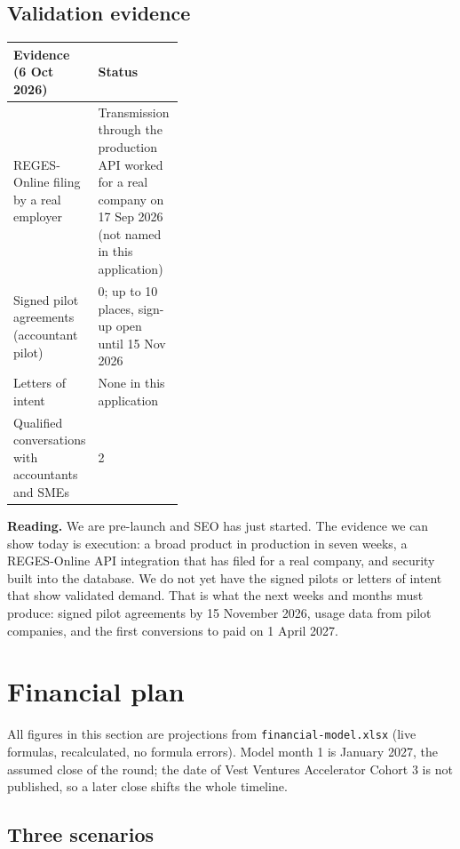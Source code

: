 \documentclass[10pt,a4paper]{article}
\newcommand{\fisier}[1]{\nolinkurl{#1}}
\begin{document}
\subsection{Validation evidence}

\begin{table}[H]
\centering\small
\begin{tabularx}{\linewidth}{@{}P{0.38\linewidth}L@{}}
\toprule
\textbf{Evidence (6 Oct 2026)} & \textbf{Status} \\
\midrule
REGES-Online filing by a real employer & Transmission through the production API worked for a real
company on 17 Sep 2026 (not named in this application) \\
Signed pilot agreements (accountant pilot) & 0; up to 10 places, sign-up open until 15 Nov 2026 \\
Letters of intent & None in this application \\
Qualified conversations with accountants and SMEs & 2 \\
\bottomrule
\end{tabularx}
\end{table}

\textbf{Reading.} We are pre-launch and SEO has just started. The evidence we can show today is
execution: a broad product in production in seven weeks, a REGES-Online API integration that has
filed for a real company, and security built into the database. We do not yet have the signed
pilots or letters of intent that show validated demand. That is what the next weeks and months
must produce: signed pilot agreements by 15 November 2026, usage data from pilot companies, and
the first conversions to paid on 1 April 2027.

\section{Financial plan}\label{sec:financiar}\nobreak

All figures in this section are projections from \fisier{financial-model.xlsx} (live formulas,
recalculated, no formula errors). Model month 1 is January 2027, the assumed close of the round;
the date of Vest Ventures Accelerator Cohort 3 is not published, so a later close shifts the whole
timeline.

\subsection{Three scenarios}
\end{document}
